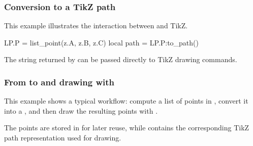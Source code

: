 \subsubsection{Conversion to a TikZ path}
\label{ssub:list_point_example_path}

This example illustrates the interaction between  and TikZ.

\begin{tkzexample}
LP.P = list_point(z.A, z.B, z.C)
local path = LP.P:to_path()
\end{tkzexample}

The string returned by  can be passed directly
to TikZ drawing commands.


\subsubsection{From  to  and drawing with }
\label{ssub:list_point_example_points_path_draw}

This example shows a typical workflow: compute a list of points in ,
convert it into a , and then draw the resulting points with
.


\begin{tkzexample}[latex = .5\textwidth]
\begin{center}
\end{center}
\end{tkzexample}

The points are stored in  for later reuse, while 
contains the corresponding TikZ path representation used for drawing.
